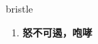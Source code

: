 
\begin{frame}
{\huge bristle}
\begin{center}
\begin{enumerate}\Large
  \item \textbf{怒不可遏，咆哮}
\end{enumerate}
\end{center}
\end{frame}
